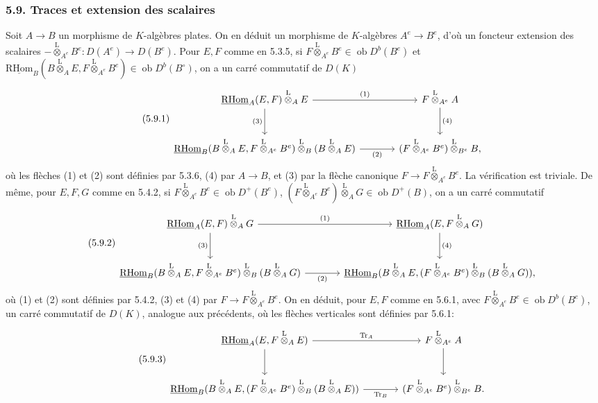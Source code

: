 \documentclass[11pt]{article}
\newcommand{\ob}{\operatorname{ob}}
\providecommand{\RHom}{\mathrm{RHom}}
\providecommand{\uRHom}{\underline{\RHom}}
\providecommand{\Tr}{\operatorname{Tr}}
\providecommand{\Tr}{\operatorname{Tr}}
\providecommand{\lten}{\overset{\mathrm L}{\otimes}}
\providecommand{\Tr}{\operatorname{Tr}}
\providecommand{\RHom}{\mathrm{RHom}}
\providecommand{\ob}{\operatorname{ob}}
\providecommand{\lten}{\overset{\mathrm L}{\otimes}}
\providecommand{\RHom}{\mathrm R\mathcal{H}om}
\providecommand{\lten}{\overset{\mathrm L}{\otimes}}
\providecommand{\Tr}{\operatorname{Tr}}
\providecommand{\lten}{\overset{\mathrm L}{\otimes}}
\providecommand{\lten}{\overset{\mathrm L}{\otimes}}
\providecommand{\lten}{\overset{\mathrm L}{\otimes}}
\providecommand{\RHom}{\mathrm{RHom}}
\providecommand{\Tr}{\operatorname{Tr}}
\providecommand{\lten}{\overset{\mathrm L}{\otimes}}
\begin{document}
\subsubsection*{5.9. Traces et extension des scalaires}

Soit $A\to B$ un morphisme de $K$-algèbres plates. On en déduit un morphisme de $K$-algèbres $A^e\to B^e$, d'où un foncteur extension des scalaires $-\lten_{A^e}B^e:D(A^e)\to D(B^e)$. Pour $E,F$ comme en 5.3.5, si $F\lten_{A^e}B^e\in\ob D^b(B^e)$ et $\uRHom_B(B\lten_AE,F\lten_{A^e}B^e)\in\ob D^b(B^\circ)$, on a un carré commutatif de $D(K)$
\begin{equation}\tag{5.9.1}
\begin{tikzcd}[column sep=large,row sep=large]
\uRHom_A(E,F)\lten_AE \arrow[r,"(1)"] \arrow[d,"(3)"'] & F\lten_{A^e}A \arrow[d,"(4)"]\\
\uRHom_B(B\lten_AE,F\lten_{A^e}B^e)\lten_B(B\lten_AE) \arrow[r,"(2)"'] & (F\lten_{A^e}B^e)\lten_{B^e}B,
\end{tikzcd}
\end{equation}
où les flèches (1) et (2) sont définies par 5.3.6, (4) par $A\to B$, et (3) par la flèche canonique $F\to F\lten_{A^e}B^e$. La vérification est triviale. De même, pour $E,F,G$ comme en 5.4.2, si $F\lten_{A^e}B^e\in\ob D^+(B^e)$, $(F\lten_{A^e}B^e)\lten_AG\in\ob D^+(B)$, on a un carré commutatif
\begin{equation}\tag{5.9.2}
\begin{tikzcd}[column sep=large,row sep=large]
\uRHom_A(E,F)\lten_AG \arrow[r,"(1)"] \arrow[d,"(3)"'] & \uRHom_A(E,F\lten_AG) \arrow[d,"(4)"]\\
\uRHom_B(B\lten_AE,F\lten_{A^e}B^e)\lten_B(B\lten_AG) \arrow[r,"(2)"'] & \uRHom_B(B\lten_AE,(F\lten_{A^e}B^e)\lten_B(B\lten_AG)),
\end{tikzcd}
\end{equation}
où (1) et (2) sont définies par 5.4.2, (3) et (4) par $F\to F\lten_{A^e}B^e$. On en déduit, pour $E,F$ comme en 5.6.1, avec $F\lten_{A^e}B^e\in\ob D^b(B^e)$, un carré commutatif de $D(K)$, analogue aux précédents, où les flèches verticales sont définies par 5.6.1:
\begin{equation}\tag{5.9.3}
\begin{tikzcd}[column sep=large,row sep=large]
\uRHom_A(E,F\lten_AE) \arrow[r,"\Tr_A"] \arrow[d] & F\lten_{A^e}A \arrow[d]\\
\uRHom_B(B\lten_AE,(F\lten_{A^e}B^e)\lten_B(B\lten_AE)) \arrow[r,"\Tr_B"'] & (F\lten_{A^e}B^e)\lten_{B^e}B.
\end{tikzcd}
\end{equation}
\end{document}
